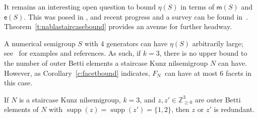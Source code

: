 \documentclass[ALCO, Unicode]{cedram}
\newcommand\ZZ{\mathbb{Z}}
\DeclareMathOperator\supp{supp}
\begin{document}
\begin{remas}\label{r:nablastaircasebound}
It remains an interesting open question to bound $\eta(S)$ in terms of $\mathsf m(S)$ and $\mathsf e(S)$.  This was posed in \cite[Conjecture~7.2]{minprescard}, and recent progress and a survey can be found in~\cite{nssyzygybounds,moscariellominpres,openproblemsrelations}.  Theorem~\ref{t:nablastaircasebound} provides an avenue for further headway.  
\end{remas}

A numerical semigroup $S$ with 4 generators can have $\eta(S)$ arbitrarily large; see~\cite{nsbettisurvey} for examples and references.  
As such, if $k = 3$, there is no upper bound to the number of outer Betti elements a staircase Kunz nilsemigroup $N$ can have.  However, as Corollary~\ref{c:facetbound} indicates, $F_N$~can have at most 6 facets in this case.  

\begin{thm}\label{t:facetbound}
If $N$ is a staircase Kunz nilsemigroup, $k = 3$, and $z, z' \in \ZZ_{\geq 0}^3$ are outer Betti elements of $N$ with $\supp(z) = \supp(z') = \{1,2\}$, then $z$ or $z'$ is redundant.
\end{thm}
\end{document}

